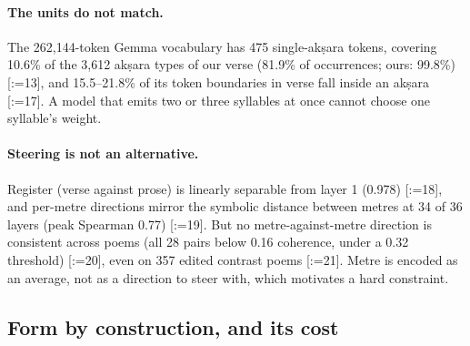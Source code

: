 \documentclass[11pt]{article}
\makeatletter
\DeclareRobustCommand{\exref}[1]{{\scriptsize[\def\ex@sep{}\@for\ex@i:=#1\do{\ex@sep
  \expandafter\ex@item\expandafter{\ex@i}\def\ex@sep{, }}]}}
\newcommand{\ex@item}[1]{\in@{-}{#1}\ifin@\ex@range#1\@nil\else\ex@link{#1}\fi}
\def\ex@range#1-#2\@nil{\ex@link{#1}--\ex@link{#2}}
\newcommand{\ex@link}[1]{\hyperref[exp:E#1]{E#1}}
\makeatother
\begin{document}
\paragraph{The units do not match.} The 262,144-token Gemma vocabulary has 475 single-akṣara tokens,
covering 10.6\% of the 3,612 akṣara types of our verse (81.9\% of occurrences; ours: 99.8\%) \exref{13}, and
15.5--21.8\% of its token boundaries in verse fall inside an akṣara \exref{17}. A model that emits two or three
syllables at once cannot choose one syllable's weight.

\paragraph{Steering is not an alternative.} Register (verse against prose) is linearly separable from layer
1 (0.978) \exref{18}, and per-metre directions mirror the symbolic distance between metres at 34 of 36 layers (peak
Spearman 0.77) \exref{19}. But no metre-against-metre direction is consistent across poems (all 28 pairs below 0.16
coherence, under a 0.32 threshold) \exref{20}, even on 357 edited contrast poems \exref{21}. Metre is encoded as an average, not
as a direction to steer with, which motivates a hard constraint.

\subsection{Form by construction, and its cost}\label{sec:form}
\end{document}
